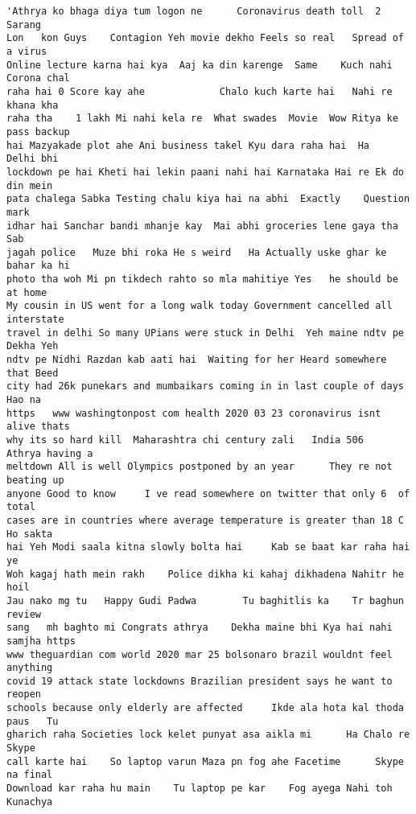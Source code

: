 \documentclass[11pt]{article}
\makeatletter
\newcommand{\boxspacing}{\kern\kvtcb@left@rule\kern\kvtcb@boxsep}
\newcommand{\prompt}[4]{
        {\ttfamily\llap{{\color{#2}[#3]:\hspace{3pt}#4}}\vspace{-\baselineskip}}
    }
\makeatother
\begin{document}
            \begin{tcolorbox}[breakable, size=fbox, boxrule=.5pt, pad at break*=1mm, opacityfill=0]
\prompt{Out}{outcolor}{16}{\boxspacing}
\begin{Verbatim}[commandchars=\\\{\}]
'Athrya ko bhaga diya tum logon ne      Coronavirus death toll  2     Sarang
Lon   kon Guys    Contagion Yeh movie dekho Feels so real   Spread of a virus
Online lecture karna hai kya  Aaj ka din karenge  Same    Kuch nahi Corona chal
raha hai 0 Score kay ahe             Chalo kuch karte hai   Nahi re khana kha
raha tha    1 lakh Mi nahi kela re  What swades  Movie  Wow Ritya ke pass backup
hai Mazyakade plot ahe Ani business takel Kyu dara raha hai  Ha    Delhi bhi
lockdown pe hai Kheti hai lekin paani nahi hai Karnataka Hai re Ek do din mein
pata chalega Sabka Testing chalu kiya hai na abhi  Exactly    Question mark
idhar hai Sanchar bandi mhanje kay  Mai abhi groceries lene gaya tha    Sab
jagah police   Muze bhi roka He s weird   Ha Actually uske ghar ke bahar ka hi
photo tha woh Mi pn tikdech rahto so mla mahitiye Yes   he should be at home
My cousin in US went for a long walk today Government cancelled all interstate
travel in delhi So many UPians were stuck in Delhi  Yeh maine ndtv pe Dekha Yeh
ndtv pe Nidhi Razdan kab aati hai  Waiting for her Heard somewhere that Beed
city had 26k punekars and mumbaikars coming in in last couple of days Hao na
https   www washingtonpost com health 2020 03 23 coronavirus isnt alive thats
why its so hard kill  Maharashtra chi century zali   India 506   Athrya having a
meltdown All is well Olympics postponed by an year      They re not beating up
anyone Good to know     I ve read somewhere on twitter that only 6  of total
cases are in countries where average temperature is greater than 18 C  Ho sakta
hai Yeh Modi saala kitna slowly bolta hai     Kab se baat kar raha hai ye
Woh kagaj hath mein rakh    Police dikha ki kahaj dikhadena Nahitr he hoil
Jau nako mg tu   Happy Gudi Padwa        Tu baghitlis ka    Tr baghun review
sang   mh baghto mi Congrats athrya    Dekha maine bhi Kya hai nahi samjha https
www theguardian com world 2020 mar 25 bolsonaro brazil wouldnt feel anything
covid 19 attack state lockdowns Brazilian president says he want to reopen
schools because only elderly are affected     Ikde ala hota kal thoda paus   Tu
gharich raha Societies lock kelet punyat asa aikla mi      Ha Chalo re Skype
call karte hai    So laptop varun Maza pn fog ahe Facetime      Skype na final
Download kar raha hu main    Tu laptop pe kar    Fog ayega Nahi toh Kunachya

\end{Verbatim}
\end{tcolorbox}
\end{document}
